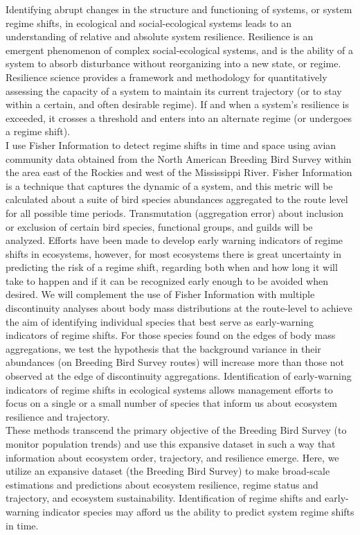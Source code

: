 \documentclass[12pt,twoside,openany]{reedthesis}
\begin{document}
Identifying abrupt changes in the structure and functioning of systems, or system regime shifts, in ecological and social-ecological systems leads to an understanding of relative and absolute system resilience. Resilience is an emergent phenomenon of complex social-ecological systems, and is the ability of a system to absorb disturbance without reorganizing into a new state, or regime. Resilience science provides a framework and methodology for quantitatively assessing the capacity of a system to maintain its current trajectory (or to stay within a certain, and often desirable regime). If and when a system's resilience is exceeded, it crosses a threshold and enters into an alternate regime (or undergoes a regime shift).\\
I use Fisher Information to detect regime shifts in time and space using avian community data obtained from the North American Breeding Bird Survey within the area east of the Rockies and west of the Mississippi River. Fisher Information is a technique that captures the dynamic of a system, and this metric will be calculated about a suite of bird species abundances aggregated to the route level for all possible time periods. Transmutation (aggregation error) about inclusion or exclusion of certain bird species, functional groups, and guilds will be analyzed. Efforts have been made to develop early warning indicators of regime shifts in ecosystems, however, for most ecosystems there is great uncertainty in predicting the risk of a regime shift, regarding both when and how long it will take to happen and if it can be recognized early enough to be avoided when desired. We will complement the use of Fisher Information with multiple discontinuity analyses about body mass distributions at the route-level to achieve the aim of identifying individual species that best serve as early-warning indicators of regime shifts. For those species found on the edges of body mass aggregations, we test the hypothesis that the background variance in their abundances (on Breeding Bird Survey routes) will increase more than those not observed at the edge of discontinuity aggregations. Identification of early-warning indicators of regime shifts in ecological systems allows management efforts to focus on a single or a small number of species that inform us about ecosystem resilience and trajectory.\\
These methods transcend the primary objective of the Breeding Bird Survey (to monitor population trends) and use this expansive dataset in such a way that information about ecosystem order, trajectory, and resilience emerge. Here, we utilize an expansive dataset (the Breeding Bird Survey) to make broad-scale estimations and predictions about ecosystem resilience, regime status and trajectory, and ecosystem sustainability. Identification of regime shifts and early-warning indicator species may afford us the ability to predict system regime shifts in time.
\end{document}

